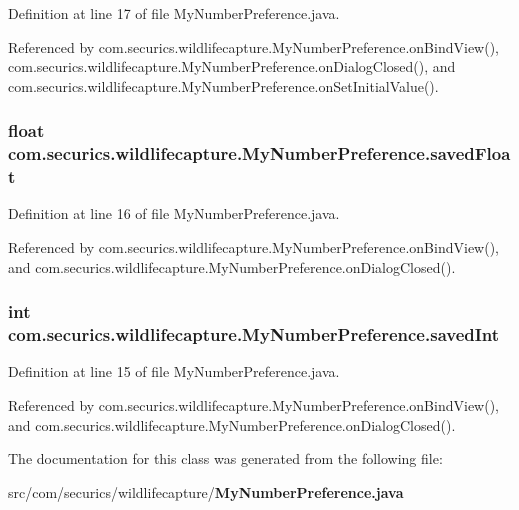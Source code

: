 Definition at line 17 of file My\+Number\+Preference.\+java.



Referenced by com.\+securics.\+wildlifecapture.\+My\+Number\+Preference.\+on\+Bind\+View(), com.\+securics.\+wildlifecapture.\+My\+Number\+Preference.\+on\+Dialog\+Closed(), and com.\+securics.\+wildlifecapture.\+My\+Number\+Preference.\+on\+Set\+Initial\+Value().

\subsubsection[{saved\+Float}]{\setlength{\rightskip}{0pt plus 5cm}float com.\+securics.\+wildlifecapture.\+My\+Number\+Preference.\+saved\+Float\hspace{0.3cm}{\ttfamily [private]}}\label{classcom_1_1securics_1_1wildlifecapture_1_1_my_number_preference_a10e883f833b5c6e16af1df7d7eef3660}


Definition at line 16 of file My\+Number\+Preference.\+java.



Referenced by com.\+securics.\+wildlifecapture.\+My\+Number\+Preference.\+on\+Bind\+View(), and com.\+securics.\+wildlifecapture.\+My\+Number\+Preference.\+on\+Dialog\+Closed().

\subsubsection[{saved\+Int}]{\setlength{\rightskip}{0pt plus 5cm}int com.\+securics.\+wildlifecapture.\+My\+Number\+Preference.\+saved\+Int\hspace{0.3cm}{\ttfamily [private]}}\label{classcom_1_1securics_1_1wildlifecapture_1_1_my_number_preference_a2dccaafe974075a0be7670dd48d73d95}


Definition at line 15 of file My\+Number\+Preference.\+java.



Referenced by com.\+securics.\+wildlifecapture.\+My\+Number\+Preference.\+on\+Bind\+View(), and com.\+securics.\+wildlifecapture.\+My\+Number\+Preference.\+on\+Dialog\+Closed().



The documentation for this class was generated from the following file\+:\begin{DoxyCompactItemize}
\item 
src/com/securics/wildlifecapture/{\bf My\+Number\+Preference.\+java}\end{DoxyCompactItemize}
